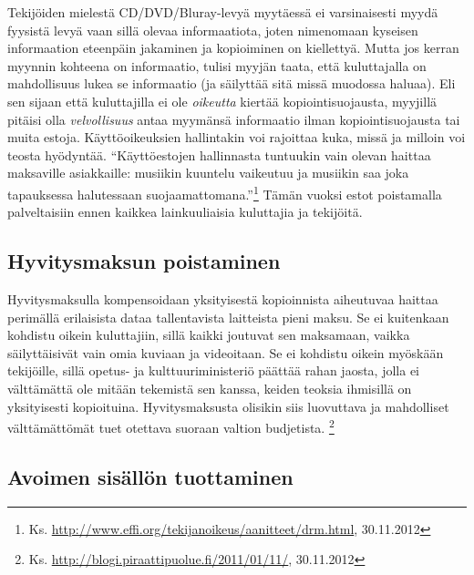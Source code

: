 \documentclass[titlepage,12pt]{article}
\begin{document}
Tekijöiden mielestä CD/DVD/Bluray-levyä myytäessä ei varsinaisesti
myydä fyysistä levyä vaan sillä olevaa informaatiota, joten nimenomaan
kyseisen informaation eteenpäin jakaminen ja kopioiminen on
kiellettyä.  Mutta jos kerran myynnin kohteena on informaatio, tulisi
myyjän taata, että kuluttajalla on mahdollisuus lukea se informaatio
(ja säilyttää sitä missä muodossa haluaa).  Eli sen sijaan että
kuluttajilla ei ole \emph{oikeutta} kiertää kopiointisuojausta,
myyjillä pitäisi olla \emph{velvollisuus} antaa myymänsä informaatio
ilman kopiointisuojausta tai muita estoja.
%
%
%
%
Käyttöoikeuksien hallintakin voi rajoittaa kuka, missä ja milloin voi
teosta hyödyntää.  ``Käyttöestojen hallinnasta tuntuukin vain olevan
haittaa maksaville asiakkaille: musiikin kuuntelu vaikeutuu ja
musiikin saa joka tapauksessa halutessaan
suojaamattomana.''\footnote{Ks. \url{http://www.effi.org/tekijanoikeus/aanitteet/drm.html},
  30.11.2012} Tämän vuoksi estot poistamalla palveltaisiin ennen
kaikkea lainkuuliaisia kuluttajia ja tekijöitä.




\subsection{Hyvitysmaksun poistaminen}

Hyvitysmaksulla kompensoidaan yksityisestä kopioinnista aiheutuvaa
haittaa perimällä erilaisista dataa tallentavista laitteista pieni
maksu.  Se ei kuitenkaan kohdistu oikein kuluttajiin, sillä kaikki
joutuvat sen maksamaan, vaikka säilyttäisivät vain omia kuviaan ja
videoitaan.  Se ei kohdistu oikein myöskään tekijöille, sillä opetus-
ja kulttuuriministeriö päättää rahan jaosta, jolla ei välttämättä ole
mitään tekemistä sen kanssa, keiden teoksia ihmisillä on yksityisesti
kopioituina.  Hyvitysmaksusta olisikin siis luovuttava ja mahdolliset
välttämättömät tuet otettava suoraan valtion budjetista.
\footnote{Ks. \url{http://blogi.piraattipuolue.fi/2011/01/11/},
  30.11.2012}


\subsection{Avoimen sisällön tuottaminen}
\end{document}

